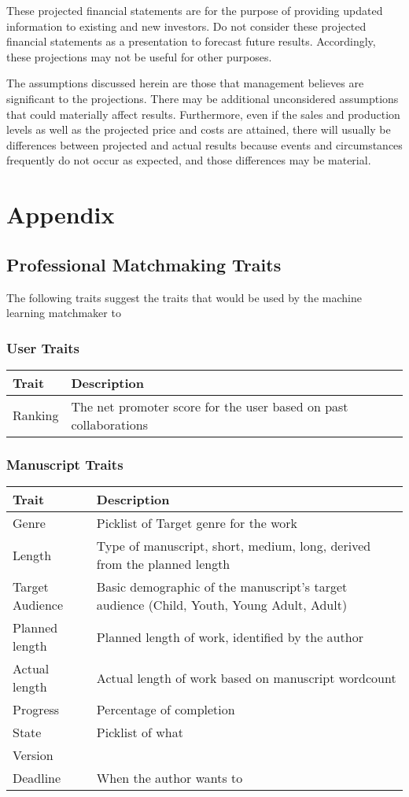 \documentclass[10pt,openany]{book}
\begin{document}
These projected financial statements are for the purpose of providing
updated information to existing and new investors. Do not consider these
projected financial statements as a presentation to forecast future
results. Accordingly, these projections may not be useful for other
purposes.

The assumptions discussed herein are those that management believes are
significant to the projections. There may be additional unconsidered
assumptions that could materially affect results. Furthermore, even if
the sales and production levels as well as the projected price and costs
are attained, there will usually be differences between projected and
actual results because events and circumstances frequently do not occur
as expected, and those differences may be material.

\backmatter
\appendix

\hypertarget{appendix}{%
\chapter{Appendix}\label{appendix}}

\hypertarget{professional-matchmaking-traits}{%
\section{Professional Matchmaking
Traits}\label{professional-matchmaking-traits}}

The following traits suggest the traits that would be used by the
machine learning matchmaker to

\hypertarget{user-traits}{%
\subsection{User Traits}\label{user-traits}}

\begin{longtable}[]{@{}ll@{}}
\toprule
Trait & Description\tabularnewline
\midrule
\endhead
Ranking & The net promoter score for the user based on past
collaborations\tabularnewline
\bottomrule
\end{longtable}

\hypertarget{manuscript-traits}{%
\subsection{Manuscript Traits}\label{manuscript-traits}}

\begin{longtable}[]{@{}ll@{}}
\toprule
Trait & Description\tabularnewline
\midrule
\endhead
Genre & Picklist of Target genre for the work\tabularnewline
Length & Type of manuscript, short, medium, long, derived from the
planned length\tabularnewline
Target Audience & Basic demographic of the manuscript's target audience
(Child, Youth, Young Adult, Adult)\tabularnewline
Planned length & Planned length of work, identified by the
author\tabularnewline
Actual length & Actual length of work based on manuscript
wordcount\tabularnewline
Progress & Percentage of completion\tabularnewline
State & Picklist of what\tabularnewline
Version &\tabularnewline
Deadline & When the author wants to\tabularnewline
\bottomrule
\end{longtable}
\end{document}
